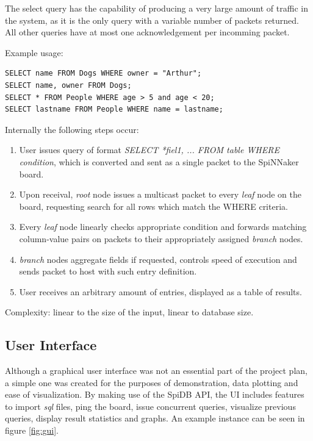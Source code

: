 The select query has the capability of producing a very large amount of traffic in the system, as it is the only query with a variable number of packets returned. All other queries have at most one acknowledgement per incomming packet. 

Example usage:
\begin{lstlisting}
SELECT name FROM Dogs WHERE owner = "Arthur";
SELECT name, owner FROM Dogs;
SELECT * FROM People WHERE age > 5 and age < 20;
SELECT lastname FROM People WHERE name = lastname;
\end{lstlisting}
   
Internally the following steps occur:
\begin{enumerate}
\item User issues query of format \textit{SELECT *\textbar fiel1, ... FROM table WHERE condition}, which is converted and sent as a single packet to the SpiNNaker board.
\item Upon receival, \textit{root} node issues a multicast packet to every \textit{leaf} node on the board, requesting search for all rows which match the WHERE criteria.
\item Every \textit{leaf} node linearly checks appropriate condition and forwards matching column-value pairs on packets to their appropriately assigned \textit{branch} nodes.
\item \textit{branch} nodes aggregate fields if requested, controls speed of execution and sends packet to host with such entry definition.
\item User receives an arbitrary amount of entries, displayed as a table of results.
\end{enumerate}

Complexity: linear to the size of the input, linear to database size.
 
\subsection{User Interface} 
Although a graphical user interface was not an essential part of the project plan, a simple one was created for the purposes of demonstration, data plotting and ease of visualization. By making use of the SpiDB API, the UI includes features to import \textit{sql} files, ping the board, issue concurrent queries, visualize previous queries, display result statistics and graphs. An example instance can be seen in figure \ref{fig:gui}.

